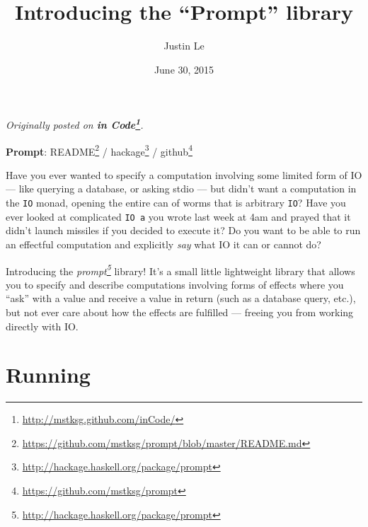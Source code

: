 \documentclass[]{article}
\title{Introducing the ``Prompt'' library}
\author{Justin Le}
\date{June 30, 2015}
\newenvironment{Shaded}{}{}
\newcommand{\KeywordTok}[1]{\textcolor[rgb]{0.00,0.44,0.13}{\textbf{{#1}}}}
\newcommand{\DataTypeTok}[1]{\textcolor[rgb]{0.56,0.13,0.00}{{#1}}}
\newcommand{\StringTok}[1]{\textcolor[rgb]{0.25,0.44,0.63}{{#1}}}
\newcommand{\CommentTok}[1]{\textcolor[rgb]{0.38,0.63,0.69}{\textit{{#1}}}}
\newcommand{\OtherTok}[1]{\textcolor[rgb]{0.00,0.44,0.13}{{#1}}}
\newcommand{\FunctionTok}[1]{\textcolor[rgb]{0.02,0.16,0.49}{{#1}}}
\newcommand{\NormalTok}[1]{{#1}}
\renewcommand{\href}[2]{#2\footnote{\url{#1}}}
\begin{document}
\maketitle

\emph{Originally posted on
\textbf{\href{http://mstksg.github.com/inCode/}{in Code}}.}

\textbf{Prompt}:
\href{https://github.com/mstksg/prompt/blob/master/README.md}{README} /
\href{http://hackage.haskell.org/package/prompt}{hackage} /
\href{https://github.com/mstksg/prompt}{github}

Have you ever wanted to specify a computation involving some limited
form of IO --- like querying a database, or asking stdio --- but didn't
want a computation in the \texttt{IO} monad, opening the entire can of
worms that is arbitrary \texttt{IO}? Have you ever looked at complicated
\texttt{IO\ a} you wrote last week at 4am and prayed that it didn't
launch missiles if you decided to execute it? Do you want to be able to
run an effectful computation and explicitly \emph{say} what IO it can or
cannot do?

Introducing the
\emph{\href{http://hackage.haskell.org/package/prompt}{prompt}} library!
It's a small little lightweight library that allows you to specify and
describe computations involving forms of effects where you ``ask'' with
a value and receive a value in return (such as a database query, etc.),
but not ever care about how the effects are fulfilled --- freeing you
from working directly with IO.

\begin{Shaded}
\end{Shaded}

\section{Running}\label{running}
\end{document}
